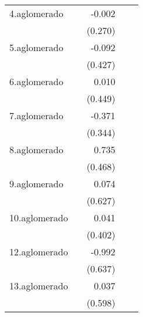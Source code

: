 {\begin{longtable}{l*{4}{D{.}{.}{-1}}}
\addlinespace
4.aglomerado&                     &      -0.002         &                     &                     \\
            &                     &     (0.270)         &                     &                     \\
\addlinespace
5.aglomerado&                     &      -0.092         &                     &                     \\
            &                     &     (0.427)         &                     &                     \\
\addlinespace
6.aglomerado&                     &       0.010         &                     &                     \\
            &                     &     (0.449)         &                     &                     \\
\addlinespace
7.aglomerado&                     &      -0.371         &                     &                     \\
            &                     &     (0.344)         &                     &                     \\
\addlinespace
8.aglomerado&                     &       0.735         &                     &                     \\
            &                     &     (0.468)         &                     &                     \\
\addlinespace
9.aglomerado&                     &       0.074         &                     &                     \\
            &                     &     (0.627)         &                     &                     \\
\addlinespace
10.aglomerado&                     &       0.041         &                     &                     \\
            &                     &     (0.402)         &                     &                     \\
\addlinespace
12.aglomerado&                     &      -0.992         &                     &                     \\
            &                     &     (0.637)         &                     &                     \\
\addlinespace
13.aglomerado&                     &       0.037         &                     &                     \\
            &                     &     (0.598)         &                     &                     \\

\end{longtable}}
